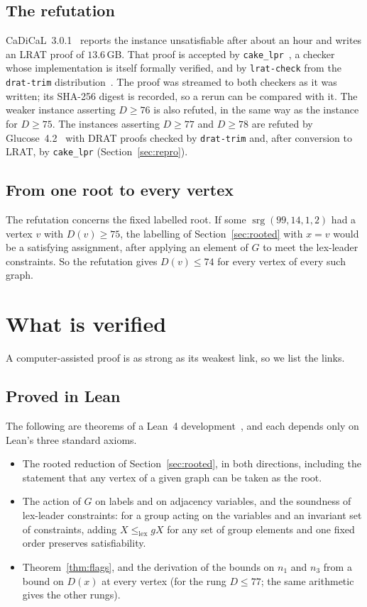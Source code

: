 \documentclass[11pt]{amsart}
\theoremstyle{remark}
\newcommand{\srg}{\operatorname{srg}}
\begin{document}
\subsection*{The refutation}
CaDiCaL~3.0.1~\cite{CaDiCaL} reports the instance unsatisfiable after
about an hour and writes an LRAT proof of $13.6$\,GB. That proof is accepted by
\texttt{cake\_lpr}~\cite{CakeLpr}, a checker whose implementation is itself
formally verified, and by \texttt{lrat-check} from the
\texttt{drat-trim} distribution~\cite{DratTrim}. The proof was streamed to both
checkers as it was written; its SHA-256 digest is recorded, so a rerun can be
compared with it. The weaker instance asserting $D\ge76$ is also
refuted, in the same way as the instance for $D\ge75$. The instances
asserting $D\ge77$ and $D\ge78$ are refuted by Glucose~4.2~\cite{Glucose} with DRAT proofs checked by
\texttt{drat-trim} and, after conversion to LRAT, by \texttt{cake\_lpr}
(Section~\ref{sec:repro}).

\subsection*{From one root to every vertex}
The refutation concerns the fixed labelled root. If some $\srg(99,14,1,2)$ had
a vertex $v$ with $D(v)\ge75$, the labelling of Section~\ref{sec:rooted} with
$x=v$ would be a satisfying assignment, after applying an element of $G$ to
meet the lex-leader constraints. So the refutation gives $D(v)\le74$ for every
vertex of every such graph.

\section{What is verified}\label{sec:trust}

A computer-assisted proof is as strong as its weakest link, so we list the
links.

\subsection*{Proved in Lean}
The following are theorems of a Lean~4 development~\cite{Lean4,Mathlib}, and
each depends only on Lean's three standard axioms.
\begin{itemize}
\item The rooted reduction of Section~\ref{sec:rooted}, in both directions,
including the statement that any vertex of a given graph can be taken as the
root.
\item The action of $G$ on labels and on adjacency variables, and the
soundness of lex-leader constraints: for a group acting on the variables and
an invariant set of constraints, adding $X\le_{\mathrm{lex}}gX$ for any set of
group elements and one fixed order preserves satisfiability.
\item Theorem~\ref{thm:flags}, and the derivation of the bounds on $n_1$ and
$n_3$ from a bound on $D(x)$ at every vertex (for the rung $D\le77$; the
same arithmetic gives the other rungs).
\end{itemize}
\end{document}
